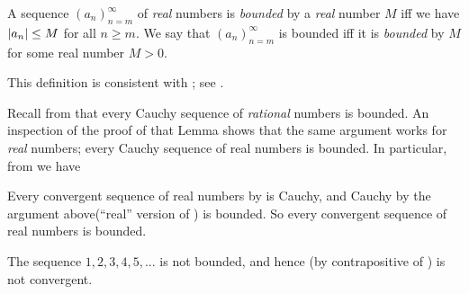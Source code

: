 \begin{definition}  \label{def 6.1.16}
A sequence \((a_n)_{n = m}^{\infty}\) of \emph{real} numbers is \emph{bounded} by a \emph{real} number \(M\) iff we have \(\lvert a_n\rvert \le M\) for all \(n \ge m\).
We say that \((a_n)_{n = m}^{\infty}\) is bounded iff it is \emph{bounded} by \(M\) for some real number \(M > 0\).
\end{definition}

\begin{note}
This definition is consistent with ; see .
\end{note}

Recall from  that every Cauchy sequence of \emph{rational} numbers is bounded.
An inspection of the proof of that Lemma shows that the same argument works for \emph{real} numbers;
every Cauchy sequence of real numbers is bounded.
In particular, from  we have
\begin{corollary} \label{corollary 6.1.17}
Every convergent sequence of real numbers by  is Cauchy, and Cauchy by the argument above(``real'' version of ) is bounded.
So every convergent sequence of real numbers is bounded.
\end{corollary}

\begin{example} \label{example 6.1.18}
The sequence \(1, 2, 3, 4, 5,...\) is not bounded, and hence (by contrapositive of ) is not convergent.
\end{example}

